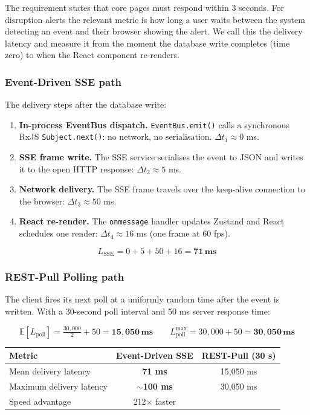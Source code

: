 \documentclass[12pt,a4paper]{article}
\begin{document}
The requirement states that core pages must respond within 3 seconds. For disruption alerts the
relevant metric is how long a user waits between the system detecting an event and their browser
showing the alert. We call this the delivery latency and measure it from the moment the database
write completes (time zero) to when the React component re-renders.

\subsubsection{Event-Driven SSE path}

The delivery steps after the database write:

\begin{enumerate}[leftmargin=1.5em, itemsep=2pt]
  \item \textbf{In-process EventBus dispatch.} \texttt{EventBus.emit()} calls a synchronous
    RxJS \texttt{Subject.next()}: no network, no serialisation. $\Delta t_1 \approx 0$ ms.
  \item \textbf{SSE frame write.} The SSE service serialises the event to JSON and writes it
    to the open HTTP response: $\Delta t_2 \approx 5$ ms.
  \item \textbf{Network delivery.} The SSE frame travels over the keep-alive connection to the
    browser: $\Delta t_3 \approx 50$ ms.
  \item \textbf{React re-render.} The \texttt{onmessage} handler updates Zustand and React
    schedules one render: $\Delta t_4 \approx 16$ ms (one frame at 60 fps).
\end{enumerate}

\[
  L_{\text{SSE}} = 0 + 5 + 50 + 16 = \mathbf{71\,\text{ms}}
\]

\subsubsection{REST-Pull Polling path}

The client fires its next poll at a uniformly random time after the event is written. With a
30-second poll interval and 50 ms server response time:

\[
  \mathbb{E}[L_{\text{poll}}] = \tfrac{30{,}000}{2} + 50 = \mathbf{15{,}050\,\text{ms}}
  \qquad
  L_{\text{poll}}^{\max} = 30{,}000 + 50 = \mathbf{30{,}050\,\text{ms}}
\]

\begin{center}
\begin{tabular}{@{}lcc@{}}
\toprule
\textbf{Metric} & \textbf{Event-Driven SSE} & \textbf{REST-Pull (30 s)} \\
\midrule
Mean delivery latency & \textcolor{successgreen}{\textbf{71 ms}} & \textcolor{warningorange}{15,050 ms} \\
Maximum delivery latency & \textcolor{successgreen}{\textbf{$\sim$100 ms}} & \textcolor{warningorange}{30,050 ms} \\
Speed advantage & 212$\times$ faster & \\
\bottomrule
\end{tabular}
\end{center}
\end{document}
